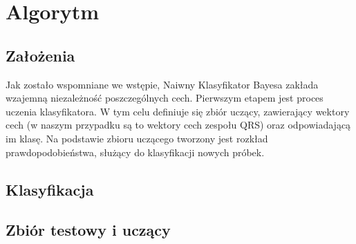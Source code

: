 \section{Algorytm}
\label{sec_algorytm}

\subsection{Założenia}
\label{sec_zalozenia}

Jak zostało wspomniane we wstępie, Naiwny Klasyfikator Bayesa zakłada wzajemną niezależność poszczególnych cech. Pierwszym etapem jest proces uczenia klasyfikatora. W tym celu definiuje się zbiór uczący, zawierający wektory cech (w naszym przypadku są to wektory cech zespołu QRS) oraz odpowiadającą im klasę. Na podstawie zbioru uczącego tworzony jest rozkład prawdopodobieństwa, służący do klasyfikacji nowych próbek. 

\subsection{Klasyfikacja}
\label{sec_klasyfikacja}

\subsection{Zbiór testowy i uczący}
\label{sec_test_ucz}